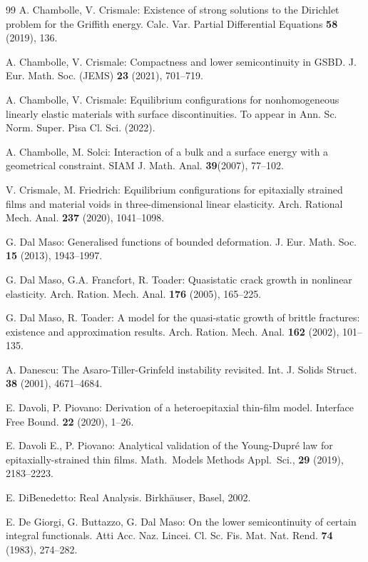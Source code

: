\documentclass[reqno]{amsart}
\numberwithin{equation}{section}
\theoremstyle{plain}
\theoremstyle{definition}
\begin{document}
\begin{thebibliography}{99}
 A. Chambolle, V. Crismale:  Existence of strong solutions to the Dirichlet problem for the Griffith energy.  Calc. Var. Partial Differential Equations {\bf 58} (2019), 136. 

  A. Chambolle, V. Crismale:  Compactness and lower semicontinuity in GSBD. J. Eur. Math. Soc. (JEMS) {\bf 23} (2021), 701--719.

 A. Chambolle, V. Crismale:  Equilibrium configurations for nonhomogeneous linearly elastic materials with surface discontinuities. To appear in Ann. Sc. Norm. Super. Pisa Cl. Sci. (2022).

 A. Chambolle, M. Solci: Interaction of a bulk and a surface energy with a geometrical constraint. SIAM J. Math. Anal. {\bf 39}(2007), 77--102.

 V. Crismale, M. Friedrich:  Equilibrium configurations for epitaxially strained films and material voids in three-dimensional linear elasticity. Arch. Rational Mech. Anal. {\bf 237} (2020), 1041--1098.

 {\sc  G. Dal Maso:} Generalised functions of bounded deformation. J. Eur. Math. Soc. {\bf 15} (2013), 1943--1997.

 G. Dal Maso, G.A. Francfort, R. Toader: Quasistatic crack growth in nonlinear elasticity. Arch. Ration. Mech. Anal. {\bf176} (2005), 165--225.


 G. Dal Maso, R. Toader: A model for the quasi-static growth of brittle fractures: existence and approximation results. Arch. Ration. Mech. Anal. {\bf162} (2002), 101--135.


 A. Danescu: The Asaro-Tiller-Grinfeld instability revisited. Int. J. Solids Struct. {\bf 38} (2001), 4671--4684.

  E. Davoli,  P. Piovano:  Derivation of a heteroepitaxial thin-film model. Interface Free Bound. {\bf 22} (2020), 1--26.

 
 E. Davoli E., P. Piovano: Analytical validation of the Young-Dupr\'e law for epitaxially-strained thin films.  Math.\ Models Methods Appl.\ Sci., \textbf{29} (2019), 2183--2223.

 

 E. DiBenedetto:  Real Analysis. Birkh\"auser, Basel, 2002.
 
 E. De Giorgi, G. Buttazzo, G. Dal Maso: On the lower semicontinuity of certain integral functionals. Atti Acc. Naz. Lincei. Cl. Sc. Fis. Mat. Nat. Rend. {\bf 74} (1983), 274--282.


\end{thebibliography}
\end{document}
